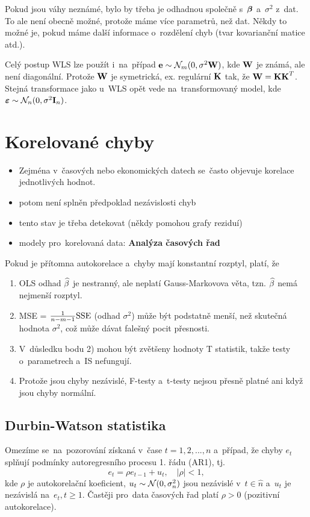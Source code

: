 \begin{remark}
Pokud jsou váhy neznámé, bylo by třeba je odhadnou společně s~$\boldsymbol{\beta}$ a~$\sigma^2$ z~dat. To ale není obecně možné, protože máme více parametrů, než dat. Někdy to možné je, pokud máme další informace o~rozdělení chyb (tvar kovarianční matice atd.).
\end{remark}

\begin{remark}
	Celý postup WLS lze použít i~na~případ $\mathbf{e} \sim \mathcal{N}_m(0,\sigma^2 \textbf{W})$, kde $\textbf{W}$ je známá, ale není diagonální. Protože $\textbf{W}$ je symetrická, ex. regulární $\textbf{K}$ tak, že $\textbf{W} = \textbf{K} \textbf{K}^T$. Stejná transformace jako u~WLS opět vede na~transformovaný model, kde $\boldsymbol{\varepsilon} \sim \mathcal{N}_n(0,\sigma^2 \textbf{I}_{n})$.
\end{remark}

\section{Korelované chyby}
\begin{itemize}
\item Zejména v~časových nebo ekonomických datech se~často objevuje korelace jednotlivých hodnot.
\item potom není splněn předpoklad nezávislosti chyb
\item tento stav je třeba detekovat (někdy pomohou grafy reziduí)
\item modely pro~korelovaná data: \textbf{Analýza časových řad}
\end{itemize}

Pokud je přítomna autokorelace a~chyby mají konstantní rozptyl, platí, že
\begin{enumerate}
\item OLS odhad $\widehat{\beta}$ je nestranný, ale neplatí Gauss-Markovova věta, tzn. $\widehat{\beta}$ nemá nejmenší rozptyl.
\item MSE = $\frac{1}{n-m-1}\mathrm{SSE}$ (odhad $\sigma^2$) může být podstatně menší, než skutečná hodnota $\sigma^2$, což může dávat falešný pocit přesnosti.
\item V~důsledku bodu 2) mohou být zvětšeny hodnoty T statistik, takže testy o~parametrech a~IS nefungují.
\item Protože jsou chyby nezávislé, F-testy a~t-testy nejsou přesně platné ani když jsou chyby normální.
\end{enumerate}

\subsection{Durbin-Watson statistika}
Omezíme se~na~pozorování získaná v~čase $t = 1,2,..., n$ a~případ, že chyby $e_t$ splňují podmínky autoregresního procesu 1. řádu (AR1), tj.
 $$
e_t = \rho e_{t-1}+ u_t, \quad |\rho| < 1,
 $$
kde $\rho$ je autokorelační koeficient, $u_t \sim \mathcal{N} (0, \sigma_n^2)$ jsou nezávislé v~$t  \in\widehat{n} $ a~$u_t$ je nezávislá na~$e_t, t \geq 1$. Častěji pro~data časových řad platí $\rho > 0$ (pozitivní autokorelace).

